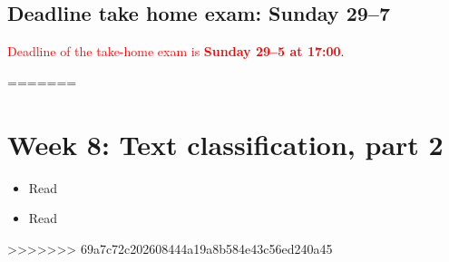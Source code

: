 \subsection*{Deadline take home exam: Sunday 29--7}
\textcolor{red}{Deadline of the take-home exam is \textbf{Sunday 29--5 at 17:00}}.


=======
\section*{Week 8: Text classification, part 2}
\begin{itemize}
	\item{Read \cite{jordan_machine_2015}}
	\item{Read \cite{meppelink_reliable_2021}}
\end{itemize}
>>>>>>> 69a7c72c202608444a19a8b584e43c56ed240a45




